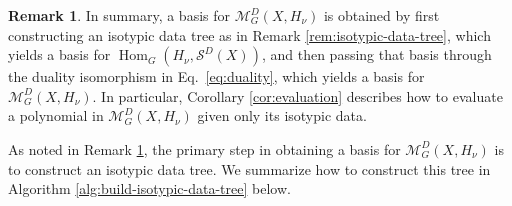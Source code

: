 \documentclass[11pt]{article}
\newcommand{\scM}{\mathcal{M}}
\newcommand{\scS}{\mathcal{S}}
\newcommand{\HomG}[2]{\operatorname{Hom}_G\!\left(#1,#2\right)}
\theoremstyle{definition}
\newtheorem{remark}[theorem]{Remark}
\begin{document}
\begin{remark}\label{rem:isotypic-data-tree-duality}
  In summary, a basis for $\scM_G^D(X,H_\nu)$ is obtained by first constructing an isotypic data tree as in Remark \ref{rem:isotypic-data-tree}, which yields a basis for $\HomG{H_\nu}{\scS^D(X)}$, and then passing that basis through the duality isomorphism in Eq.~\eqref{eq:duality}, which yields a basis for $\scM_G^D(X,H_\nu)$.
  In particular, Corollary \ref{cor:evaluation} describes how to evaluate a polynomial in $\scM_G^D(X,H_\nu)$ given only its isotypic data.
\end{remark}



As noted in Remark \ref{rem:isotypic-data-tree-duality}, the primary step in obtaining a basis for $\scM_G^D(X,H_\nu)$ is to construct an isotypic data tree.
We summarize how to construct this tree in Algorithm \ref{alg:build-isotypic-data-tree} below.
\end{document}
